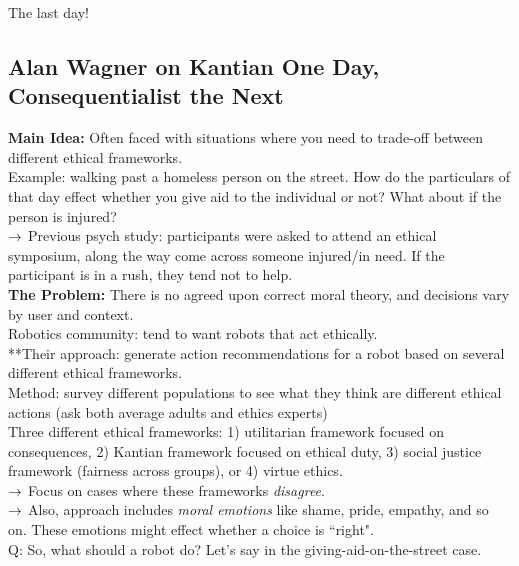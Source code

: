 The last day!

\subsection{Alan Wagner on Kantian One Day, Consequentialist the Next}

{\bf Main Idea:} Often faced with situations where you need to trade-off between different ethical frameworks. \\

Example: walking past a homeless person on the street. How do the particulars of that day effect whether you give aid to the individual or not? What about if the person is injured?\\

$\rightarrow$ Previous psych study: participants were asked to attend an ethical symposium, along the way come across someone injured/in need. If the participant is in a rush, they tend not to help. \\

{\bf The Problem:} There is no agreed upon correct moral theory, and decisions vary by user and context. \\

Robotics community: tend to want robots that act ethically. \\

**Their approach: generate action recommendations for a robot based on several different ethical frameworks. \\

Method: survey different populations to see what they think are different ethical actions (ask both average adults and ethics experts) \\

Three different ethical frameworks: 1) utilitarian framework focused on consequences, 2) Kantian framework focused on ethical duty, 3) social justice framework (fairness across groups), or 4) virtue ethics. \\

$\rightarrow$ Focus on cases where these frameworks {\it disagree}. \\

$\rightarrow$ Also, approach includes {\it moral emotions} like shame, pride, empathy, and so on. These emotions might effect whether a choice is ``right". \\

Q: So, what should a robot do? Let's say in the giving-aid-on-the-street case.\\

